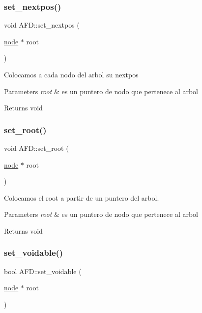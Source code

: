 \subsubsection{\texorpdfstring{set\+\_\+nextpos()}{set\_nextpos()}}
{\footnotesize\ttfamily void A\+F\+D\+::set\+\_\+nextpos (\begin{DoxyParamCaption}\item[{\hyperlink{structnode}{node} $\ast$}]{root }\end{DoxyParamCaption})}

Colocamos a cada nodo del arbol su nextpos 
\begin{DoxyParams}{Parameters}
{\em root} & es un puntero de nodo que pertenece al arbol \\
\hline
\end{DoxyParams}
\begin{DoxyReturn}{Returns}
void 
\end{DoxyReturn}
\hypertarget{class_a_f_d_ac2df8498d53da64cef08893ab213db12}{}\label{class_a_f_d_ac2df8498d53da64cef08893ab213db12} 
\subsubsection{\texorpdfstring{set\+\_\+root()}{set\_root()}}
{\footnotesize\ttfamily void A\+F\+D\+::set\+\_\+root (\begin{DoxyParamCaption}\item[{\hyperlink{structnode}{node} $\ast$}]{root }\end{DoxyParamCaption})}

Colocamos el root a partir de un puntero del arbol. 
\begin{DoxyParams}{Parameters}
{\em root} & es un puntero de nodo que pertenece al arbol \\
\hline
\end{DoxyParams}
\begin{DoxyReturn}{Returns}
void 
\end{DoxyReturn}
\hypertarget{class_a_f_d_ab5db119b186c71e653e54d4abc82c068}{}\label{class_a_f_d_ab5db119b186c71e653e54d4abc82c068} 
\subsubsection{\texorpdfstring{set\+\_\+voidable()}{set\_voidable()}}
{\footnotesize\ttfamily bool A\+F\+D\+::set\+\_\+voidable (\begin{DoxyParamCaption}\item[{\hyperlink{structnode}{node} $\ast$}]{root }\end{DoxyParamCaption})}

